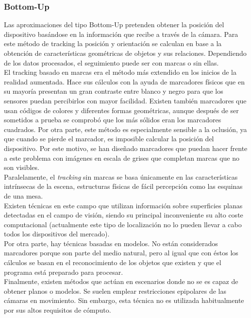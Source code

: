 \subsubsection{Bottom-Up}
Las aproximaciones del tipo Bottom-Up pretenden obtener la posición del dispositivo basándose en la información que recibe a través de la cámara.
Para este método de tracking la posición y orientación se calculan en base a la obtención de características geométricas de objetos y sus relaciones. Dependiendo de los datos procesados, el seguimiento puede ser con marcas o sin ellas.\\
El tracking basado en marcas era el método más extendido en los inicios de la realidad aumentada. Hace sus cálculos con la ayuda de marcadores físicos que en su mayoría presentan un gran contraste entre blanco y negro para que los sensores puedan percibirlos con mayor facilidad. Existen también marcadores que usan códigos de colores y diferentes formas geométricas, aunque después de ser sometidos a prueba se comprobó que los más sólidos eran los marcadores cuadrados. Por otra parte, este método es especialmente sensible a la oclusión, ya que cuando se pierde el marcador, es imposible calcular la posición del dispositivo. Por este motivo, se han diseñado marcadores que puedan hacer frente a este problema con imágenes en escala de grises que completan marcas que no son visibles.\\
Paralelamente, el \textit{tracking} sin marcas se basa únicamente en las características intrínsecas de la escena, estructuras físicas de fácil percepción como las esquinas de una mesa.\\
Existen técnicas en este campo que utilizan información sobre superficies planas detectadas en el campo de visión, siendo su principal inconveniente su alto coste computacional (actualmente este tipo de localización no lo pueden llevar a cabo todos los dispositivos del mercado).\\
Por otra parte, hay técnicas basadas en modelos. No están considerados marcadores porque son parte del medio natural, pero al igual que con éstos los cálculos se basan en el reconocimiento de los objetos que existen y que el programa está preparado para procesar.\\
Finalmente, existen métodos que actúan en escenarios donde no se es capaz de obtener planos o modelos. Se suelen emplear restricciones epipolares de las cámaras en movimiento. Sin embargo, esta técnica no es utilizada habitualmente por sus altos requisitos de cómputo.\\
